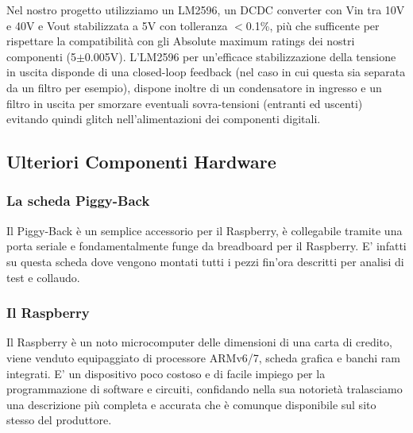 \documentclass[10pt]{article}
\begin{document}
		Nel nostro progetto utilizziamo un LM2596, un DCDC converter con Vin tra 10V e 40V e Vout stabilizzata a 5V con tolleranza \(<\)0.1\%, più che sufficente per rispettare la compatibilità con gli Absolute maximum ratings dei nostri componenti (5\(\pm\)0.005V).
		L'LM2596 per un'efficace stabilizzazione della tensione in uscita disponde di una closed-loop feedback (nel caso in cui questa sia separata da un filtro per esempio), dispone inoltre di un condensatore in ingresso e un filtro in uscita per smorzare eventuali sovra-tensioni (entranti ed uscenti) evitando quindi glitch nell'alimentazioni dei componenti digitali.

	\subsection{Ulteriori Componenti Hardware}
		\subsubsection{La scheda Piggy-Back}\label{sec:piggy}
	Il Piggy-Back è un semplice accessorio per il Raspberry, è collegabile tramite una porta seriale e fondamentalmente funge da breadboard per il Raspberry. E' infatti su questa scheda dove vengono montati tutti i pezzi fin'ora descritti per analisi di test e collaudo.

		\subsubsection{Il Raspberry}\label{sec:rasp}
	Il Raspberry è un noto microcomputer delle dimensioni di una carta di credito, viene venduto equipaggiato di processore ARMv6/7, scheda grafica e banchi ram integrati. E' un dispositivo poco costoso e di facile impiego per la programmazione di software e circuiti, confidando nella sua notorietà tralasciamo una descrizione più completa e accurata che è comunque disponibile sul sito stesso del produttore.
\end{document}
